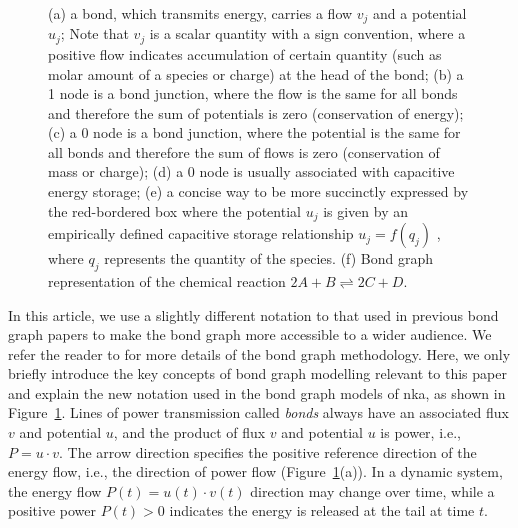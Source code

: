 \documentclass{biophys-new}
\newcommand{\rev}[1]{{\color{black} #1}}
\begin{document}
\begin{figure}[!htbp]  
\centering  

\caption{(a) a bond, which transmits energy, carries a flow $v_j$ and a potential $u_j$; \rev{Note that $v_j$ is a scalar quantity with a sign convention, where a positive flow indicates accumulation of certain quantity (such as molar amount of a species or charge) at the head of the bond;}
(b) a 1 node is a bond junction, where the flow is the same for all bonds and therefore the sum of potentials is zero (conservation of energy);
(c) a 0 node is a bond junction, where the potential is the same for all bonds and therefore the sum of flows is zero (conservation of mass or charge);
(d) a 0 node is usually associated with capacitive energy storage;
(e) a concise way to be more succinctly expressed by the red-bordered box where the potential $u_j$ is given by an empirically defined capacitive storage relationship $u_j=f(q_j)$\rev{, where $q_j$ represents the quantity of the species. (f) Bond graph representation of the chemical reaction $2A + B \rightleftharpoons  2C + D$.    
}}
\label{fig:bg_concepts}
\end{figure}

In this article, we use a slightly different notation to that used in previous bond graph papers \cite{gawthrop_energy-based_2014,pan_bond_2018,pan_bond_2019,pan_cardiac_2020,hunter_energy-based_2025} to make the bond graph more accessible to a wider audience. 
We refer the reader to \cite{gawthrop_energy-based_2014,pan_bond_2018,pan_bond_2019,pan_cardiac_2020,hunter_energy-based_2025} for more details of the bond graph methodology.
Here, we only briefly introduce the key concepts of bond graph modelling relevant to this paper and explain the new notation used in the bond graph models of \Gls{nka}, as shown in Figure~\ref{fig:bg_concepts}.
Lines of power transmission called \emph{bonds} always have an associated flux $v$ and potential $u$, and the product of flux $v$ and potential $u$ is power, i.e., $P=u\cdot v$. The arrow direction specifies the positive reference direction of the energy flow, i.e., the direction of power flow (Figure~\ref{fig:bg_concepts}(a)). In a dynamic system, the energy flow  $P(t)=u(t)\cdot v(t)$ direction may change over time, while a positive power $P(t)>0$ indicates the energy is released at the tail at time $t$. 
\end{document}
